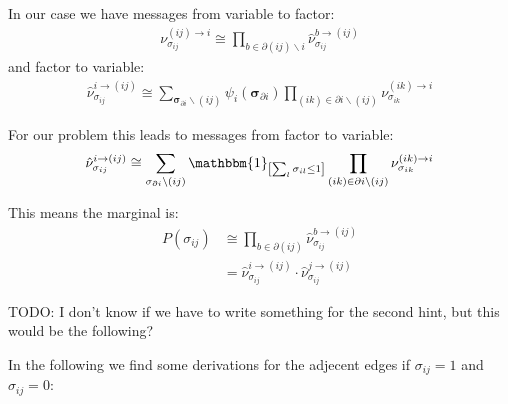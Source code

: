 \documentclass[a4paper]{scrartcl}
\begin{document}
In our case we have messages from variable to factor:
\begin{align}
    \nu_{\sigma_{ij}}^{(ij) \rightarrow i} \cong \prod_{b \in \partial (ij) \backslash i} \hat{\nu}_{\sigma_{ij}}^{b \rightarrow (ij)}
\end{align}
and factor to variable:
\begin{align}
    \hat{\nu}_{\sigma_{ij}}^{i \rightarrow (ij)} \cong \sum_{\boldsymbol{\sigma}_{\partial i} \backslash (ij)} 
    \psi_i(\boldsymbol{\sigma}_{\partial i}) \prod_{(ik) \in \partial i \backslash (ij)} \nu_{\sigma_{ik}}^{(ik) \rightarrow i}
\end{align}

For our problem this leads to messages from factor to variable:
\begin{align}
    \hat{\nu}_{\sigma_{ij}}^{i \rightarrow (ij)} &\cong \sum_{\sigma_{\partial i} \backslash (ij)} \mathbbm{1}_{\left[\sum_l \sigma_{il} \leq 1 \right]} \prod_{(ik) \in \partial i \backslash (ij)} \nu_{\sigma_{ik}}^{(ik) \rightarrow i}\\
\end{align}

This means the marginal is:
\begin{align}
    P(\sigma_{ij}) &\cong \prod_{b \in \partial (ij)} \hat{\nu}_{\sigma_{ij}}^{b \rightarrow (ij)} \\
    &= \hat{\nu}_{\sigma_{ij}}^{i \rightarrow (ij)} \cdot \hat{\nu}_{\sigma_{ij}}^{j \rightarrow (ij)}
\end{align}



{
\color{green}
TODO: I don't know if we have to write something for the second hint, but this would be the following?
}

In the following we find some derivations for the adjecent edges if $\sigma_{ij} = 1$ and $\sigma_{ij} = 0$:
\end{document}
